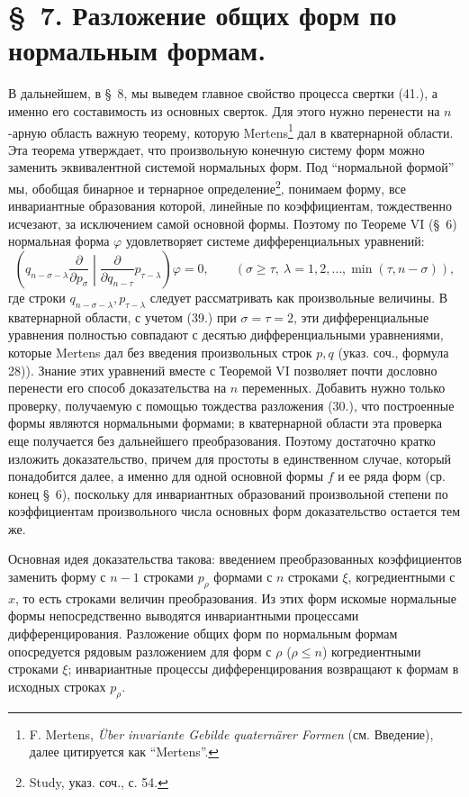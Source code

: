 \documentclass[11pt]{article}
\begin{document}
\section*{\S\ 7. Разложение общих форм по нормальным формам.}

В дальнейшем, в \S\ 8, мы выведем главное свойство процесса свертки (41.), а именно его составимость из основных сверток. Для этого нужно перенести на $n$-арную область важную теорему, которую Mertens\footnote{F. Mertens, \emph{\"Uber invariante Gebilde quatern\"arer Formen} (см. Введение), далее цитируется как ``Mertens''.} дал в кватернарной области. Эта теорема утверждает, что произвольную конечную систему форм можно заменить эквивалентной системой нормальных форм. Под ``нормальной формой'' мы, обобщая бинарное и тернарное определение\footnote{Study, указ. соч., с. 54.}, понимаем форму, все инвариантные образования которой, линейные по коэффициентам, тождественно исчезают, за исключением самой основной формы. Поэтому по Теореме VI (\S\ 6) нормальная форма $\varphi$ удовлетворяет системе дифференциальных уравнений:
\begin{equation}
 \left(q_{n-\sigma-\lambda}\frac{\partial}{\partial p_\sigma}\middle|\frac{\partial}{\partial q_{n-\tau}}p_{\tau-\lambda}\right)\varphi=0,
 \qquad(\sigma\ge\tau,\ \lambda=1,2,\ldots,\min(\tau,n-\sigma)),
\tag{46}
\end{equation}
где строки $q_{n-\sigma-\lambda},p_{\tau-\lambda}$ следует рассматривать как произвольные величины. В кватернарной области, с учетом (39.) при $\sigma=\tau=2$, эти дифференциальные уравнения полностью совпадают с десятью дифференциальными уравнениями, которые Mertens дал без введения произвольных строк $p,q$ (указ. соч., формула 28)). Знание этих уравнений вместе с Теоремой VI позволяет почти дословно перенести его способ доказательства на $n$ переменных. Добавить нужно только проверку, получаемую с помощью тождества разложения (30.), что построенные формы являются нормальными формами; в кватернарной области эта проверка еще получается без дальнейшего преобразования. Поэтому достаточно кратко изложить доказательство, причем для простоты в единственном случае, который понадобится далее, а именно для одной основной формы $f$ и ее ряда форм (ср. конец \S\ 6), поскольку для инвариантных образований произвольной степени по коэффициентам произвольного числа основных форм доказательство остается тем же.

Основная идея доказательства такова: введением преобразованных коэффициентов заменить форму с $n-1$ строками $p_\rho$ формами с $n$ строками $\xi$, когредиентными с $x$, то есть строками величин преобразования. Из этих форм искомые нормальные формы непосредственно выводятся инвариантными процессами дифференцирования. Разложение общих форм по нормальным формам опосредуется рядовым разложением для форм с $\rho$ ($\rho\le n$) когредиентными строками $\xi$; инвариантные процессы дифференцирования возвращают к формам в исходных строках $p_\rho$.
\end{document}
